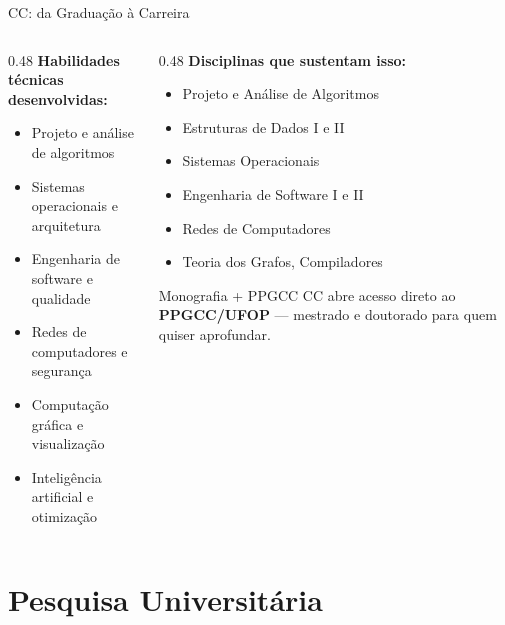 \documentclass[aspectratio=169]{beamer}
\newcommand{\ntc}[1]{\textcolor{mblue}{#1}}
\begin{document}
\begin{frame}{CC: da Graduação à Carreira}
  \begin{columns}[T]
    \begin{column}{0.48\textwidth}
      \textbf{Habilidades técnicas desenvolvidas:}
      \begin{itemize}\setlength\itemsep{3pt}
        \item Projeto e análise de algoritmos
        \item Sistemas operacionais e arquitetura
        \item Engenharia de software e qualidade
        \item Redes de computadores e segurança
        \item Computação gráfica e visualização
        \item Inteligência artificial e otimização
      \end{itemize}
    \end{column}
    \begin{column}{0.48\textwidth}
      \textbf{Disciplinas que sustentam isso:}
      \begin{itemize}\setlength\itemsep{3pt}
        \item \ntc{Projeto e Análise de Algoritmos}
        \item \ntc{Estruturas de Dados I e II}
        \item \ntc{Sistemas Operacionais}
        \item \ntc{Engenharia de Software I e II}
        \item \ntc{Redes de Computadores}
        \item \ntc{Teoria dos Grafos, Compiladores}
      \end{itemize}
      \pause
      \vspace{0.2cm}
      \begin{alertblock}{Monografia + PPGCC}
        CC abre acesso direto ao \textbf{PPGCC/UFOP} --- mestrado e doutorado para quem quiser aprofundar.
      \end{alertblock}
    \end{column}
  \end{columns}
\end{frame}

\section{Pesquisa Universitária}
\end{document}
